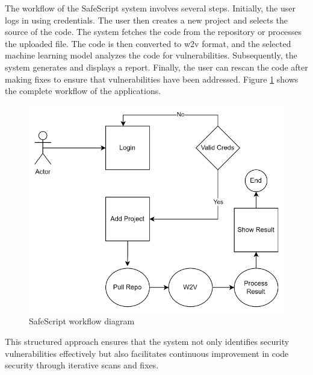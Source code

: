 The workflow of the SafeScript system involves several steps. Initially, the user logs in using credentials. 
The user then creates a new project and selects the source of the code. 
The system fetches the code from the repository or processes the uploaded file. 
The code is then converted to w2v format, and the selected machine learning model analyzes the code for vulnerabilities. 
Subsequently, the system generates and displays a report. Finally, the user can rescan the code after making fixes to ensure that vulnerabilities have been addressed.
Figure \ref{fig:workflow} shows the complete workflow of the applications.

\begin{figure}[H]
    \centering
    \includegraphics[width=0.9\linewidth]{images/workflow.png}
    \caption{SafeScript workflow diagram}
    \label{fig:workflow}
\end{figure}

This structured approach ensures that the system not only identifies security vulnerabilities effectively but also facilitates continuous improvement in code security through iterative scans and fixes.